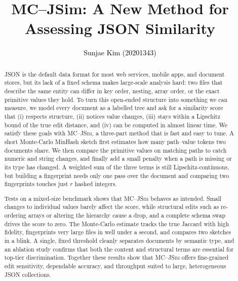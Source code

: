\documentclass[sigconf]{acmart}
\begin{document}
\title{{MC–JSim: A New Method for Assessing JSON Similarity}}

\author{\textcolor{black}{Sunjae Kim (20201343)}}

\renewcommand{\shortauthors}{{Kim et al.}}

\begin{abstract}
JSON is the default data format for most web services, mobile apps, and document stores, but its lack of a fixed schema makes large-scale analysis hard: two files that describe the same entity can differ in key order, nesting, array order, or the exact primitive values they hold. To turn this open-ended structure into something we can measure, we model every document as a labelled tree and ask for a similarity score that (i) respects structure, (ii) notices value changes, (iii) stays within a Lipschitz bound of the true edit distance, and (iv) can be computed in almost linear time. We satisfy these goals with \textsc{MC--JSim}, a three-part method that is fast and easy to tune. A short Monte-Carlo MinHash sketch first estimates how many path–value tokens two documents share. We then compare the primitive values on matching paths to catch numeric and string changes, and finally add a small penalty when a path is missing or its type has changed. A weighted sum of the three terms is still Lipschitz-continuous, but building a fingerprint needs only one pass over the document and comparing two fingerprints touches just $r$ hashed integers.

Tests on a mixed-size benchmark shows that \textsc{MC--JSim} behaves as intended.  Small changes to individual values barely affect the score, while structural edits such as re-ordering arrays or altering the hierarchy cause a drop, and a complete schema swap drives the score to zero. The Monte-Carlo estimate tracks the true Jaccard with high fidelity, fingerprints very large files in well under a second, and compares two sketches in a blink. A single, fixed threshold cleanly separates documents by semantic type, and an ablation study confirms that both the content and structural terms are essential for top-tier discrimination.  Together these results show that \textsc{MC--JSim} offers fine-grained edit sensitivity, dependable accuracy, and throughput suited to large, heterogeneous JSON collections.

\end{abstract}

\renewcommand\footnotetextcopyrightpermission[1]{} %
\end{document}
